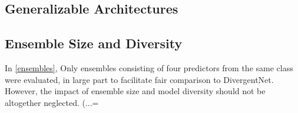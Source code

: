     \subsection{Generalizable Architectures}
        
    \subsection{Ensemble Size and Diversity}
        In \autoref{ensembles}, Only ensembles consisting of four predictors from the same class were evaluated, in large part to facilitate fair comparison to DivergentNet. However, the impact of ensemble size and model diversity should not be altogether neglected. (...=